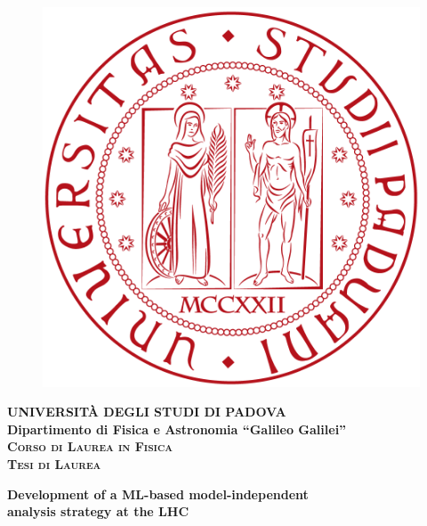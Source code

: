 \thispagestyle{empty}
\frontmatter
\begin{titlepage}
\vspace{5mm}
\begin{figure}[hbtp]
\centering
\includegraphics[scale=.13]{Images/UNIPD.png}
\end{figure}
\vspace{5mm}
\begin{center}
{{\huge{\textsc{\bf UNIVERSIT\`A DEGLI STUDI DI PADOVA}}}\\}
\vspace{5mm}
{\Large{\bf Dipartimento di Fisica e Astronomia ``Galileo Galilei''}} \\
\vspace{5mm}
{\Large{\textsc{\bf Corso di Laurea in Fisica}}}\\
\vspace{20mm}
{\Large{\textsc{\bf Tesi di Laurea}}}\\
\vspace{30mm}
\begin{spacing}{3}
{\LARGE \textbf{Development of a ML-based model-independent \\analysis strategy at the LHC}}\\
\end{spacing}
\vspace{8mm}
\end{center}


\end{titlepage}
